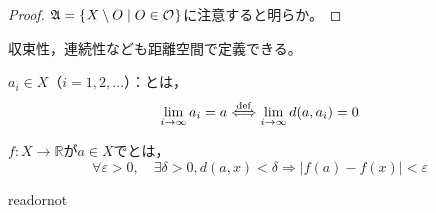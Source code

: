 \documentclass{jsarticle}
\begin{document}
\begin{proof}
     $\mathfrak{A} = \Set{\hspace{-1.8pt}  X \setminus O | O \in \mathcal{O} \hspace{-1.8pt}}$に注意すると明らか。


\end{proof}

収束性，連続性なども距離空間で定義できる。

\begin{teigi}
     $a_{i} \in X$（$i=1,2,\dots$）：とは，
    \begin{equation}
        \lim_{i \to \infty} a_{i} = a \overset{\mathrm{def}}{\Longleftrightarrow} \lim_{i \to \infty} d(a, a_{i}) = 0
    \end{equation}
    
     $f:X \longrightarrow \mathbb{R}$が$a \in X$でとは，
    \begin{equation}
        \forall \varepsilon > 0, \quad \exists \delta > 0, d(a,x) < \delta \Longrightarrow \left| f(a) - f(x) \right| < \varepsilon
    \end{equation}
\end{teigi}

\expandafter\ifx\csname readornot\endcsname\relax
  
\end{document}
